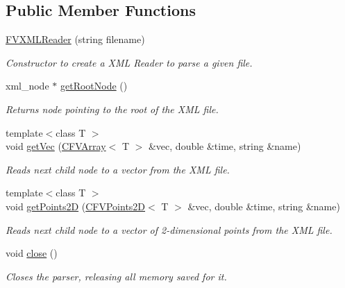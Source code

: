 \subsection*{Public Member Functions}
\begin{DoxyCompactItemize}
\item 
\hyperlink{classFVL_1_1FVXMLReader_ad64566c91703b6facc7e8abb99bd592f}{FVXMLReader} (string filename)
\begin{DoxyCompactList}\small\item\em Constructor to create a XML Reader to parse a given file. \item\end{DoxyCompactList}\item 
xml\_\-node $\ast$ \hyperlink{classFVL_1_1FVXMLReader_af32db3b332fc7072762a13ced879f55a}{getRootNode} ()
\begin{DoxyCompactList}\small\item\em Returns node pointing to the root of the XML file. \item\end{DoxyCompactList}\item 
{\footnotesize template$<$class T $>$ }\\void \hyperlink{classFVL_1_1FVXMLReader_a942ee6c1f6d520aa22106044984d8677}{getVec} (\hyperlink{classFVL_1_1CFVArray}{CFVArray}$<$ T $>$ \&vec, double \&time, string \&name)
\begin{DoxyCompactList}\small\item\em Reads next child node to a vector from the XML file. \item\end{DoxyCompactList}\item 
{\footnotesize template$<$class T $>$ }\\void \hyperlink{classFVL_1_1FVXMLReader_a40dd2b3c9977316e8f3be7ea51db4d0c}{getPoints2D} (\hyperlink{classFVL_1_1CFVPoints2D}{CFVPoints2D}$<$ T $>$ \&vec, double \&time, string \&name)
\begin{DoxyCompactList}\small\item\em Reads next child node to a vector of 2-\/dimensional points from the XML file. \item\end{DoxyCompactList}\item 
void \hyperlink{classFVL_1_1FVXMLReader_a5ae591df94fc66ccb85cbb6565368bca}{close} ()
\begin{DoxyCompactList}\small\item\em Closes the parser, releasing all memory saved for it. \item\end{DoxyCompactList}\end{DoxyCompactItemize}

